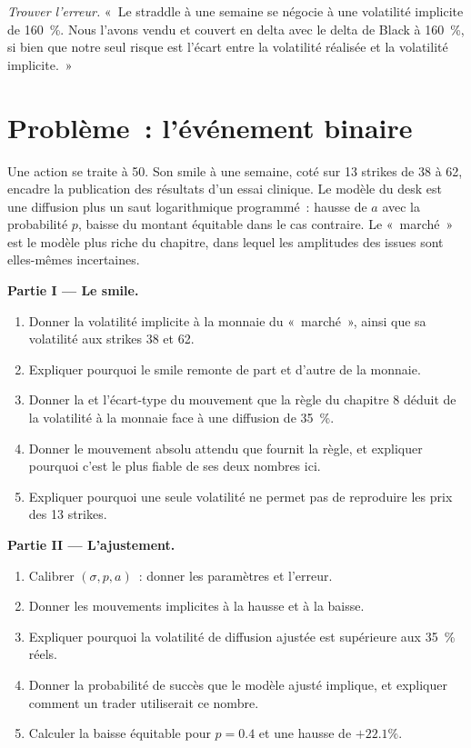 \begin{exercise}[$\star\star\star$]\label{exo:dv:jumps-and-levy-models:8}
\emph{Trouver l'erreur.} «~Le straddle à une semaine se négocie à une volatilité implicite de 160~\%. Nous l'avons vendu et couvert en delta
avec le delta de Black à 160~\%, si bien que notre seul risque est l'écart entre la volatilité réalisée et la volatilité implicite.~»
\end{exercise}

\section{Problème~: l'événement binaire}

\begin{problem}\label{pb:dv:jumps-and-levy-models:1}
Une action se traite à 50. Son smile à une semaine, coté sur 13 strikes de 38 à 62, encadre la publication des
résultats d'un essai clinique. Le modèle du desk est une diffusion plus un saut logarithmique programmé~: hausse de $a$ avec la probabilité $p$, baisse du
montant équitable dans le cas contraire. Le «~marché~» est le modèle plus riche du chapitre, dans lequel les amplitudes des issues sont elles-mêmes
incertaines.

\medskip\noindent\textbf{Partie I --- Le smile.}
\begin{enumerate}
\item Donner la volatilité implicite à la monnaie du «~marché~», ainsi que sa volatilité aux strikes 38 et 62.
\item Expliquer pourquoi le smile remonte de part et d'autre de la monnaie.
\item Donner la  et l'écart-type du mouvement que la règle du chapitre 8 déduit de la volatilité à la
monnaie face à une diffusion de 35~\%.
\item Donner le mouvement absolu attendu que fournit la règle, et expliquer pourquoi c'est le plus fiable de ses deux nombres ici.
\item Expliquer pourquoi une seule volatilité ne permet pas de reproduire les prix des 13 strikes.
\end{enumerate}

\medskip\noindent\textbf{Partie II --- L'ajustement.}
\begin{enumerate}[resume]
\item Calibrer $(\sigma,p,a)$~: donner les paramètres et l'erreur.
\item Donner les mouvements implicites à la hausse et à la baisse.
\item Expliquer pourquoi la volatilité de diffusion ajustée est supérieure aux 35~\% réels.
\item Donner la probabilité de succès que le modèle ajusté implique, et expliquer comment un trader utiliserait ce nombre.
\item Calculer la baisse équitable pour $p=0.4$ et une hausse de $+22.1\%$.
\end{enumerate}


\end{problem}
